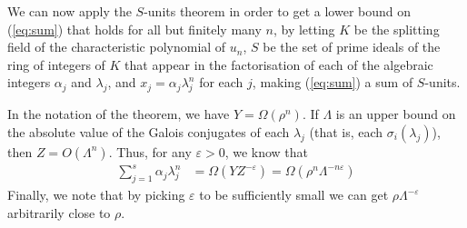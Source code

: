 We can now apply the $S$-units theorem in order to get a lower bound on (\ref{eq:sum}) that holds for all but finitely many $n$, by letting $K$ be the splitting field of the characteristic polynomial of $u_n$, $S$ be the set of prime ideals of the ring of integers of $K$ that appear in the factorisation of each of the algebraic integers $\alpha_j$ and $\lambda_j$, and $x_j=\alpha_j\lambda_j^n$ for each $j$, making (\ref{eq:sum}) a sum of $S$-units.

In the notation of the theorem, we have $Y=\Omega(\rho^n)$. If $\Lambda$ is an upper bound on the absolute value of the Galois conjugates of each $\lambda_j$ (that is, each $\sigma_i(\lambda_j)$), then $Z=O(\Lambda^n)$. Thus, for any $\varepsilon>0$, we know that
\begin{align*}
\sum\limits_{j=1}^s\alpha_j\lambda_j^n &=\Omega(YZ^{-\varepsilon})=
\Omega\left(\rho^n\Lambda^{-n\varepsilon}\right)
\end{align*}
Finally, we note that by picking $\varepsilon$ to be sufficiently small we can get $\rho\Lambda^{-\varepsilon}$ arbitrarily close to $\rho$.
